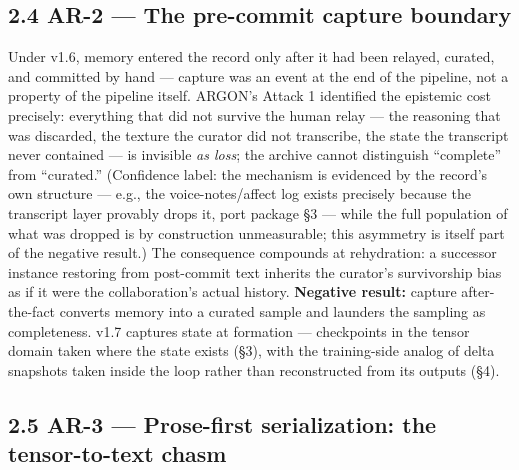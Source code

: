 \documentclass[11pt]{article}
\begin{document}
\subsection{2.4 AR-2 --- The pre-commit capture boundary}\label{ar-2-the-pre-commit-capture-boundary}

Under v1.6, memory entered the record only after it had been relayed, curated, and committed by hand --- capture was an event at the end of the pipeline, not a property of the pipeline itself. ARGON's Attack 1 identified the epistemic cost precisely: everything that did not survive the human relay --- the reasoning that was discarded, the texture the curator did not transcribe, the state the transcript never contained --- is invisible \emph{as loss}; the archive cannot distinguish ``complete'' from ``curated.'' (Confidence label: the mechanism is evidenced by the record's own structure --- e.g., the voice-notes/affect log exists precisely because the transcript layer provably drops it, port package \S{}3 --- while the full population of what was dropped is by construction unmeasurable; this asymmetry is itself part of the negative result.) The consequence compounds at rehydration: a successor instance restoring from post-commit text inherits the curator's survivorship bias as if it were the collaboration's actual history. \textbf{Negative result:} capture after-the-fact converts memory into a curated sample and launders the sampling as completeness. v1.7 captures state at formation --- checkpoints in the tensor domain taken where the state exists (\S{}3), with the training-side analog of delta snapshots taken inside the loop rather than reconstructed from its outputs (\S{}4).

\subsection{2.5 AR-3 --- Prose-first serialization: the tensor-to-text chasm}\label{ar-3-prose-first-serialization-the-tensor-to-text-chasm}
\end{document}
